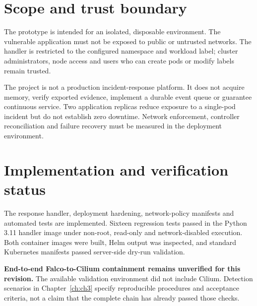 \section{Scope and trust boundary}
The prototype is intended for an isolated, disposable environment. The vulnerable
application must not be exposed to public or untrusted networks. The handler is
restricted to the configured namespace and workload label; cluster administrators,
node access and users who can create pods or modify labels remain trusted.

The project is not a production incident-response platform. It does not acquire
memory, verify exported evidence, implement a durable event queue or guarantee
continuous service. Two application replicas reduce exposure to a single-pod
incident but do not establish zero downtime. Network enforcement, controller
reconciliation and failure recovery must be measured in the deployment environment.

\section{Implementation and verification status}
The response handler, deployment hardening, network-policy manifests and automated
tests are implemented. Sixteen regression tests passed in the Python 3.11 handler
image under non-root, read-only and network-disabled execution. Both container
images were built, Helm output was inspected, and standard Kubernetes manifests
passed server-side dry-run validation.

\textbf{End-to-end Falco-to-Cilium containment remains unverified for this revision.}
The available validation environment did not include Cilium. Detection scenarios
in Chapter~\ref{ch:ch3} specify reproducible procedures and acceptance criteria,
not a claim that the complete chain has already passed those checks.
